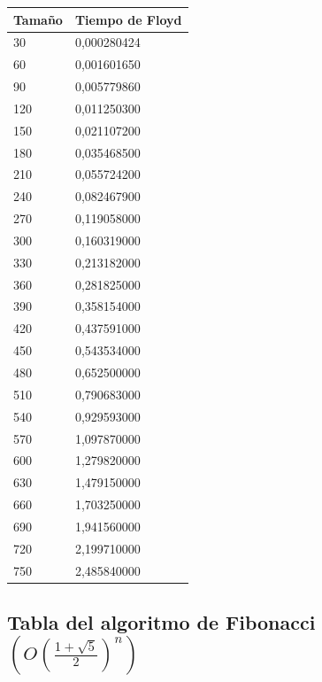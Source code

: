 \documentclass[a4paper, 11pt]{article}
\begin{document}
\begin{tabular}{|l|l|}
	\hline
	Tamaño & Tiempo de Floyd \\
	\hline
	\hline
	30	&0,000280424\\
	\hline
	60	&0,001601650\\
	\hline
	90	&0,005779860\\
	\hline
	120	&0,011250300\\
	\hline
	150	&0,021107200\\
	\hline
	180	&0,035468500\\
	\hline
	210	&0,055724200\\
	\hline
	240	&0,082467900\\
	\hline
	270	&0,119058000\\
	\hline
	300	&0,160319000\\
	\hline
	330	&0,213182000\\
	\hline
	360	&0,281825000\\
	\hline
	390	&0,358154000\\
	\hline
	420	&0,437591000\\
	\hline
	450	&0,543534000\\
	\hline
	480	&0,652500000\\
	\hline
	510	&0,790683000\\
	\hline
	540	&0,929593000\\
	\hline
	570	&1,097870000\\
	\hline
	600	&1,279820000\\
	\hline
	630	&1,479150000\\
	\hline
	660	&1,703250000\\
	\hline
	690	&1,941560000\\
	\hline
	720	&2,199710000\\
	\hline
	750	&2,485840000\\
	\hline
\end{tabular}

\subsection{Tabla del algoritmo de Fibonacci $(O(\frac{1+\sqrt{5}}{2})^n)$}
\end{document}
